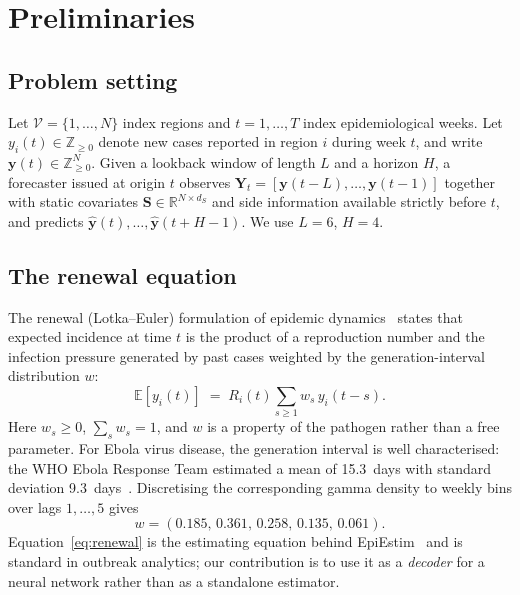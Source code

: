 \documentclass[conference]{IEEEtran}
\newcommand{\bR}{\mathbb{R}}
\newcommand{\E}{\mathbb{E}}
\begin{document}


\section{Preliminaries}\label{sec:prelim}

\subsection{Problem setting}

Let $\mathcal{V}=\{1,\dots,N\}$ index regions and $t=1,\dots,T$ index epidemiological weeks. Let $y_i(t)\in\mathbb{Z}_{\geq0}$ denote new cases reported in region $i$ during week $t$, and write $\mathbf{y}(t)\in\mathbb{Z}_{\geq0}^N$. Given a lookback window of length $L$ and a horizon $H$, a forecaster issued at origin $t$ observes $\mathbf{Y}_{t}=[\mathbf{y}(t-L),\dots,\mathbf{y}(t-1)]$ together with static covariates $\mathbf{S}\in\bR^{N\times d_S}$ and side information available strictly before $t$, and predicts $\hat{\mathbf{y}}(t),\dots,\hat{\mathbf{y}}(t+H-1)$. We use $L=6$, $H=4$.

\subsection{The renewal equation}

The renewal (Lotka--Euler) formulation of epidemic dynamics~\cite{fraser2007,cori2013} states that expected incidence at time $t$ is the product of a reproduction number and the infection pressure generated by past cases weighted by the generation-interval distribution $w$:
\begin{equation}
\E[y_i(t)] \;=\; R_i(t)\sum_{s\geq1} w_s\, y_i(t-s).
\label{eq:renewal}
\end{equation}
Here $w_s\geq0$, $\sum_s w_s=1$, and $w$ is a property of the pathogen rather than a free parameter. For Ebola virus disease, the generation interval is well characterised: the WHO Ebola Response Team estimated a mean of \SI{15.3}{days} with standard deviation \SI{9.3}{days}~\cite{who2014}. Discretising the corresponding gamma density to weekly bins over lags $1,\dots,5$ gives
\begin{equation}
w = (0.185,\,0.361,\,0.258,\,0.135,\,0.061).
\label{eq:w}
\end{equation}
Equation~\eqref{eq:renewal} is the estimating equation behind EpiEstim~\cite{cori2013} and is standard in outbreak analytics; our contribution is to use it as a \emph{decoder} for a neural network rather than as a standalone estimator.
\end{document}
